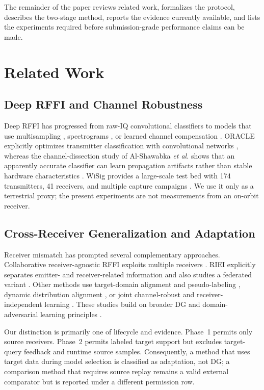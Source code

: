 \documentclass[journal]{IEEEtran}
\begin{document}
The remainder of the paper reviews related work, formalizes the protocol, describes the two-stage method, reports the evidence currently available, and lists the experiments required before submission-grade performance claims can be made.

\section{Related Work}

\subsection{Deep RFFI and Channel Robustness}

Deep RFFI has progressed from raw-IQ convolutional classifiers \cite{merchant2018deep,riyaz2018radioid,sankhe2019oracle} to models that use multisampling \cite{yu2019multisampling}, spectrograms \cite{shen2021lora}, or learned channel compensation \cite{restuccia2019deepradioid}. ORACLE explicitly optimizes transmitter classification with convolutional networks \cite{sankhe2019oracle}, whereas the channel-dissection study of Al-Shawabka \emph{et al.} shows that an apparently accurate classifier can learn propagation artifacts rather than stable hardware characteristics \cite{alshawabka2020exposing}. WiSig provides a large-scale test bed with 174 transmitters, 41 receivers, and multiple capture campaigns \cite{hanna2022wisig}. We use it only as a terrestrial proxy; the present experiments are not measurements from an on-orbit receiver.

\subsection{Cross-Receiver Generalization and Adaptation}

Receiver mismatch has prompted several complementary approaches. Collaborative receiver-agnostic RFFI exploits multiple receivers \cite{shen2024receiveragnostic}. RIEI explicitly separates emitter- and receiver-related information and also studies a federated variant \cite{zhang2024riei}. Other methods use target-domain alignment and pseudo-labeling \cite{liu2024receiverimpact}, dynamic distribution alignment \cite{feng2025dadda}, or joint channel-robust and receiver-independent learning \cite{ma2025channelrobust}. These studies build on broader DG and domain-adversarial learning principles \cite{ganin2016dann,zhou2021mixstyle,zhou2023dgsurvey}.

Our distinction is primarily one of lifecycle and evidence. Phase~1 permits only source receivers. Phase~2 permits labeled target support but excludes target-query feedback and runtime source samples. Consequently, a method that uses target data during model selection is classified as adaptation, not DG; a comparison method that requires source replay remains a valid external comparator but is reported under a different permission row.
\end{document}
